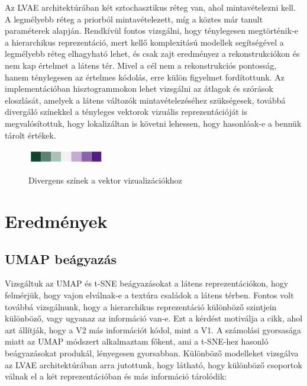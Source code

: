 \documentclass[12pt, english]{article}
\begin{document}
\vspace{4mm}

\par Az LVAE architektúrában két sztochasztikus réteg van, ahol mintavételezni kell. A legmélyebb réteg a priorból mintavételezett, míg a köztes már tanult paraméterek alapján. Rendkívül fontos vizsgálni, hogy ténylegesen megtörténik-e a hierarchikus reprezentáció, mert kellő komplexitású modellek segítségével a legmélyebb réteg elhagyható lehet, és csak zajt eredményez a rekonstrukciókon és nem kap értelmet a látens tér. Mivel a cél nem a rekonstrukciós pontosság, hanem ténylegesen az értelmes kódolás, erre külön figyelmet fordítottunk. Az implementációban hisztogrammokon lehet vizsgálni az átlagok és szórások eloszlását, amelyek a látens változók mintavételezéséhez szükségesek, továbbá divergáló színekkel a tényleges vektorok vizuális reprezentációját is megvalósítottuk, hogy lokalizáltan is követni lehessen, hogy hasonlóak-e a bennük tárolt értékek.

\vspace{4mm}

\begin{figure}[H]
    \centering
    \includegraphics[width=0.3\textwidth]{diverging_color.png}
    \label{fig:diverging_colors}
    \caption{Divergens színek a vektor vizualizációkhoz}
\end{figure}

\vspace{4mm}

\newpage

\section{Eredmények}

\vspace{7mm}

\subsection{UMAP beágyazás}

\vspace{4mm}

\par Vizsgáltuk az UMAP \cite{mcinnes2018umap} és t-SNE \cite{maaten2008visualizing} beágyazásokat a látens reprezentációkon, hogy felmérjük, hogy vajon elválnak-e a textúra családok a látens térben. Fontos volt továbbá vizsgálnunk, hogy a hierarchikus reprezentáció különböző szintjein különböző, vagy ugyanaz az információ van-e. Ezt a kérdést motiválja a \cite{ZiembaV2} cikk, ahol azt állítják, hogy a V2 más információt kódol, mint a V1. A számolási gyorsasága miatt az UMAP módszert alkalmaztam főkent, ami a t-SNE-hez hasonló beágyazásokat produkál, lényegesen gyorsabban. Különböző modelleket vizsgálva az LVAE architektúrában arra jutottunk, hogy látható, hogy különböző csoportok válnak el a két reprezentációban és más információ tárolódik:
\end{document}
